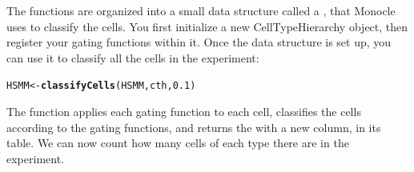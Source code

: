 \documentclass[10pt,oneside]{article}\usepackage[]{graphicx}\usepackage[]{color}
\makeatletter
\newcommand{\hlnum}[1]{\textcolor[rgb]{0.686,0.059,0.569}{#1}}%
\newcommand{\hlstd}[1]{\textcolor[rgb]{0.345,0.345,0.345}{#1}}%
\newcommand{\hlkwb}[1]{\textcolor[rgb]{0.69,0.353,0.396}{#1}}%
\newcommand{\hlkwd}[1]{\textcolor[rgb]{0.737,0.353,0.396}{\textbf{#1}}}%
\newenvironment{kframe}{%
 \def\at@end@of@kframe{}%
 \ifinner\ifhmode%
  \def\at@end@of@kframe{\end{minipage}}%
  \begin{minipage}{\columnwidth}%
 \fi\fi%
 \def\FrameCommand##1{\hskip\@totalleftmargin \hskip-\fboxsep
 \colorbox{shadecolor}{##1}\hskip-\fboxsep
     \hskip-\linewidth \hskip-\@totalleftmargin \hskip\columnwidth}%
 \MakeFramed {\advance\hsize-\width
   \@totalleftmargin\z@ \linewidth\hsize
   \@setminipage}}%
 {\par\unskip\endMakeFramed%
 \at@end@of@kframe}
\newenvironment{knitrout}{}{} %
\makeatother
\begin{document}
 The functions are organized into a small data structure called a , that Monocle uses to classify the cells. You first initialize a new CellTypeHierarchy object, then register your gating functions within it. Once the data structure is set up, you can use it to classify all the cells in the experiment:
 
\begin{knitrout}
\color{fgcolor}\begin{kframe}
\begin{alltt}
\hlstd{HSMM} \hlkwb{<-} \hlkwd{classifyCells}\hlstd{(HSMM, cth,} \hlnum{0.1}\hlstd{)}
\end{alltt}
\end{kframe}
\end{knitrout}
 
 The function  applies each gating function to each cell, classifies the cells according to the gating functions, and returns the  with a new column,  in its  table. We can now count how many cells of each type there are in the experiment.
 
\end{document}
